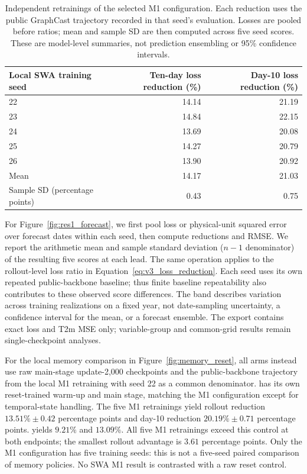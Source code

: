\documentclass{article}
\newcommand{\vfourchange}[1]{{\color{blue}#1}}
\newcommand{\vfourred}[1]{{\color{red}#1}}
\newif\ifvfivechanges
\newcommand{\vfiveidentity}[1]{#1}
\DeclareRobustCommand{\vfiveadded}[1]{\ifvfivechanges{\color{vfiveAdded}%
  \let\vfourchange\vfiveidentity\let\vfourred\vfiveidentity#1}\else{\color{blue}%
  \let\vfourchange\vfiveidentity\let\vfourred\vfiveidentity#1}\fi}
\DeclareRobustCommand{\vfivewordchange}[2]{\ifvfivechanges{\color{vfiveDeleted}\sout{#1}}\,\fi\vfiveadded{#2}}
\begin{document}
\begin{table}[!htbp]
    \centering
    \small
    \begingroup\color{blue}
    \begin{tabular}{lrr}
        \toprule
        Local SWA training seed & Ten-day loss reduction (\%) & Day-10 loss reduction (\%) \\
        \midrule
        22 & 14.14 & 21.19 \\
        23 & 14.84 & 22.15 \\
        24 & 13.69 & 20.08 \\
        25 & 14.27 & 20.79 \\
        26 & 13.90 & 20.92 \\
        \midrule
        Mean & 14.17 & 21.03 \\
        Sample SD (percentage points) & 0.43 & 0.75 \\
        \bottomrule
    \end{tabular}
    \endgroup
    \caption{\vfourchange{Independent retrainings of the selected M1 configuration. Each reduction uses the public GraphCast trajectory recorded in that seed's evaluation. Losses are pooled before ratios; mean and sample SD are then computed across five seed scores. These are model-level summaries, not prediction ensembling or 95\% confidence intervals.}}
    \label{tab:seed_replication}
\end{table}

\vfourchange{For Figure~\ref{fig:res1_forecast}, we first pool loss or physical-unit squared error over forecast dates within each seed, then compute reductions and RMSE. We report the arithmetic mean and sample standard deviation ($n-1$ denominator) of the resulting five scores at each lead. The same operation applies to the rollout-level loss ratio in Equation~\ref{eq:v3_loss_reduction}. Each seed uses its own repeated public-backbone baseline; thus finite baseline repeatability also contributes to these observed score differences. The band describes variation across training realizations on a fixed year, not date-sampling uncertainty, a confidence interval for the mean, or a forecast ensemble. The export contains exact loss and T2m MSE only; variable-group and common-grid results remain single-checkpoint analyses.}

\vfourchange{For the local memory comparison in Figure~\ref{fig:memory_reset}, all arms instead use raw main-stage update-2,000 checkpoints and the public-backbone trajectory from the local M1 retraining with seed 22 as a common denominator. \vfivewordchange{Reset/reset}{The local R1 retraining} has its own reset-trained warm-up and main stage, matching the M1 configuration except for temporal-state handling. The five M1 retrainings yield rollout reduction $13.51\%\pm0.42$ percentage points and day-10 reduction $20.19\%\pm0.71$ percentage points. \vfivewordchange{Local reset/reset}{The local R1 retraining} yields $9.21\%$ and $13.09\%$. All five M1 retrainings exceed this control at both endpoints; the smallest rollout advantage is $3.61$ percentage points. Only the M1 configuration has five training seeds: this is not a five-seed paired comparison of memory policies. No SWA M1 result is contrasted with a raw reset control.}
\end{document}
